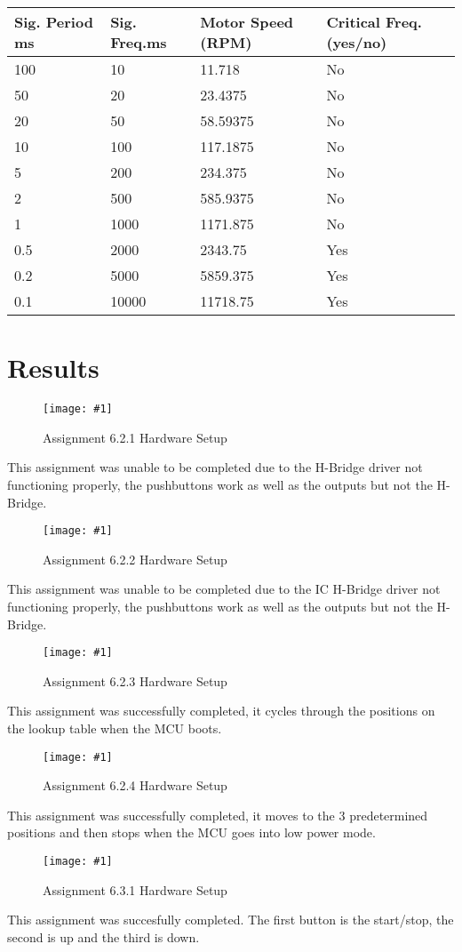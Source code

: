 \documentclass[journal]{IEEEtran}
\newcommand\createfigure[2]{
  \begin{figure}[H]
    \centering \texttt{[image: \#1]}
    \caption{#2}
  \end{figure}}
\begin{document}
\begin{center}
\begin{table}[!h]
  \begin{tabularx}{0.4\textwidth}{|X|X|X|X|}
   \hline
    Sig. Period \si{\milli\second}&Sig. Freq.\si{\milli\second}&Motor Speed (RPM)&Critical Freq. (yes/no)\\
   \hline
    100&10&11.718&No\\
   \hline
    50&20&23.4375&No\\
   \hline
    20&50&58.59375&No\\
   \hline
    10&100&117.1875&No\\
   \hline
    5&200&234.375&No\\
   \hline
    2&500&585.9375&No\\
   \hline
    1&1000&1171.875&No\\
   \hline
    0.5&2000&2343.75&Yes\\
   \hline
    0.2&5000&5859.375&Yes\\
   \hline
    0.1&10000&11718.75&Yes\\
   \hline
  \end{tabularx}
\end{table}
\end{center}
\section{Results}
\createfigure{./Figures/6.2.1.jpeg}{Assignment 6.2.1 Hardware Setup}
This assignment was unable to be completed due to the H-Bridge driver not functioning properly, the pushbuttons work as well as the outputs but not the H-Bridge.
\createfigure{./Figures/6.2.2.jpeg}{Assignment 6.2.2 Hardware Setup}
This assignment was unable to be completed due to the IC H-Bridge driver not functioning properly, the pushbuttons work as well as the outputs but not the H-Bridge.
\createfigure{./Figures/6.2.3.jpeg}{Assignment 6.2.3 Hardware Setup}
This assignment was successfully completed, it cycles through the positions on the lookup table when the MCU boots.
\createfigure{./Figures/6.2.4.jpeg}{Assignment 6.2.4 Hardware Setup}
This assignment was successfully completed, it moves to the 3 predetermined positions and then stops when the MCU goes into low power mode.
\createfigure{./Figures/6.3.1.jpeg}{Assignment 6.3.1 Hardware Setup}
This assignment was succesfully completed. The first button is the start/stop, the second is up and the third is down.
\nocite{rojasEmbeddedSystemsDesign2016}
\nocite{LCDControllerDatasheets}


\end{document}
